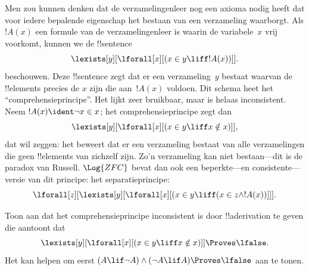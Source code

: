 \documentclass[../../../include/open-logic-section]{subfiles}
\begin{document}
Men zou kunnen denken dat de verzamelingenleer nog een axioma nodig
heeft dat voor iedere bepalende eigenschap het bestaan van een
verzameling waarborgt. Als $!A(x)$ een formule van de
verzamelingenleer is waarin de variabele~$x$ vrij voorkomt, kunnen we
de !!{sentence}
\[
\lexists[y][\lforall[x][(x \in y \liff !A(x))]].
\]
beschouwen. Deze !!{sentence} zegt dat er een verzameling~$y$ bestaat
waarvan de !!{element}s precies de $x$ zijn die aan~$!A(x)$ voldoen.
Dit schema heet het ``comprehensieprincipe''. Het lijkt zeer bruikbaar,
maar is helaas inconsistent. Neem $!A(x) \ident \lnot x \in x$; het
comprehensieprincipe zegt dan
\[
\lexists[y][\lforall[x][(x \in y \liff x \notin x)]],
\]
dat wil zeggen: het beweert dat er een verzameling bestaat van alle
verzamelingen die geen !!{element}s van zichzelf zijn. Zo'n verzameling
kan niet bestaan---dit is de paradox van Russell. $\Log{ZFC}$ bevat
dan ook een beperkte---en consistente---versie van dit principe: het
separatieprincipe:
\[
\lforall[z][\lexists[y][\lforall[x][(x \in y \liff (x \in z \land
      !A(x))]]].
\]

\begin{prob}
Toon aan dat het comprehensieprincipe inconsistent is door
!!a{derivation} te geven die aantoont dat
\[
\lexists[y][\lforall[x][(x \in y \liff x \notin x)]] \Proves \lfalse.
\]
Het kan helpen om eerst $(A \lif \lnot A) \land (\lnot A \lif A)
\Proves \lfalse$ aan te tonen.
\end{prob}
\end{document}
